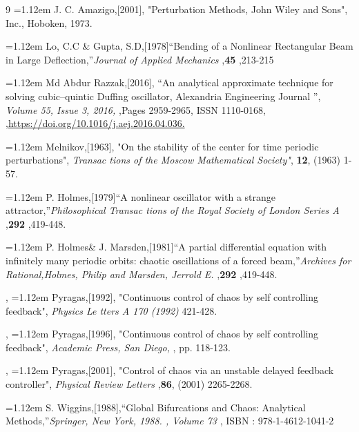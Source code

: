 \documentclass{ws-ijbc}
\begin{document}
\begin{thebibliography}{9}
\hangindent=1.12em J. C. Amazigo,[2001], "Perturbation Methods, John Wiley and Sons", Inc., Hoboken, 1973.


\hangindent=1.12em Lo, C.C \&  Gupta, S.D,[1978]``Bending of a Nonlinear Rectangular Beam in Large Deflection,''{\it Journal of Applied Mechanics } ,{\bf45} ,213-215


\hangindent=1.12em Md Abdur Razzak,[2016],
``An analytical approximate technique for solving cubic–quintic Duffing oscillator,
Alexandria Engineering Journal '',
{\it Volume 55, Issue 3,
2016,
},Pages 2959-2965,
ISSN 1110-0168,
,\url{https://doi.org/10.1016/j.aej.2016.04.036.}

\hangindent=1.12em Melnikov,[1963],
 "On the stability of the
center for time periodic perturbations", {\it Transac tions of the Moscow
Mathematical Society"}, {\bf12}, (1963) 1-57.




\hangindent=1.12em P. Holmes,[1979]``A nonlinear oscillator with a strange attractor,''{\it Philosophical Transac tions of the Royal Society of London Series A } ,{\bf292} ,419-448.


\hangindent=1.12em P. Holmes\& J. Marsden,[1981]``A partial differential equation with
infinitely many periodic orbits: chaotic oscillations of a forced beam,''{\it Archives for Rational,Holmes, Philip and Marsden, Jerrold E.} ,{\bf292} ,419-448.

 , 
\hangindent=1.12em Pyragas,[1992],
"Continuous control of chaos by self controlling
feedback", {\it Physics Le tters A 170 (1992)} 421-428.


 , 
\hangindent=1.12em Pyragas,[1996],
"Continuous control of chaos by self controlling
feedback", {\it Academic Press, San Diego, }, pp. 118-123.


 , 
\hangindent=1.12em Pyragas,[2001],
"Control of chaos via an unstable delayed
feedback controller", {\it Physical Review Letters} ,{\bf86}, (2001) 2265-2268. 


\hangindent=1.12em S. Wiggins,[1988],``Global Bifurcations and Chaos: Analytical Methods,''{\it Springer, New York, 1988.
, Volume 73} , ISBN : 978-1-4612-1041-2



\end{thebibliography}
\end{document}

